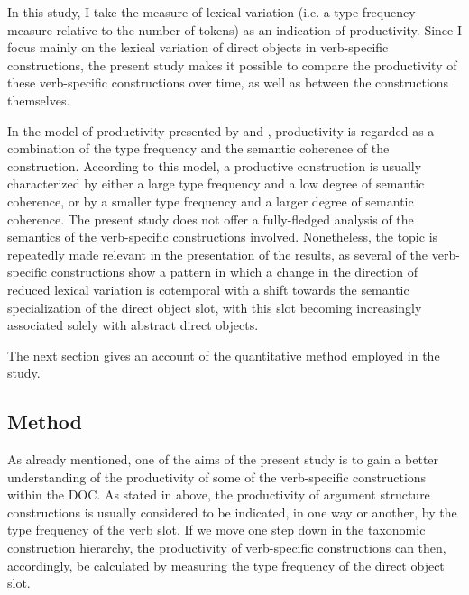 \documentclass[output=paper]{langscibook}
\begin{document}
In this study, I take the measure of lexical variation (i.e. a type frequency measure relative to the number of tokens) as an indication of productivity. Since I focus mainly on the lexical variation of direct objects in verb-specific constructions, the present study makes it possible to compare the productivity of these verb-specific constructions over time, as well as between the constructions themselves.



In the model of productivity presented by \textcite{Bardal2008} and  \citet{BardalGildea2015}, productivity is regarded as a combination of the type frequency and the semantic coherence of the construction. According to this model, a productive construction is usually characterized by either a large type frequency and a low degree of semantic coherence, or by a smaller type frequency and a larger degree of semantic coherence. The present study does not offer a fully-fledged analysis of the semantics of the verb-specific constructions involved. Nonetheless, the topic is repeatedly made relevant in the presentation of the results, as several of the verb-specific constructions show a pattern in which a change in the direction of reduced lexical variation is cotemporal with a shift towards the semantic specialization of the direct object slot, with this slot becoming increasingly associated solely with abstract direct objects.



The next section gives an account of the quantitative method employed in the study.


\subsection{Method}\label{sec:valdeson:3.3}


As already mentioned, one of the aims of the present study is to gain a better understanding of the productivity of some of the verb-specific constructions within the DOC. As stated in  above, the productivity of argument structure constructions is usually considered to be indicated, in one way or another, by the type frequency of the verb slot. If we move one step down in the taxonomic construction hierarchy, the productivity of verb-specific constructions can then, accordingly, be calculated by measuring the type frequency of the direct object slot.
\end{document}
